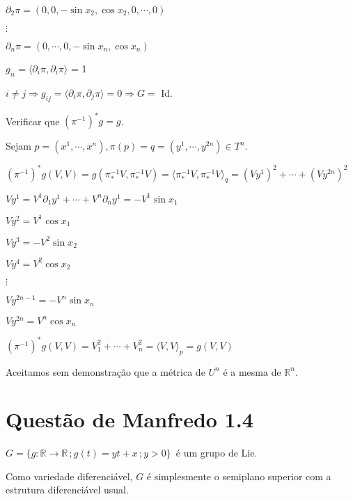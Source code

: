 \documentclass[10pt,a4paper]{article}
\begin{document}
		$\partial_2 \pi = (0, 0, - \sin x_2, \cos x_2, 0, \cdots, 0)$

		$\vdots$

		$\partial_n \pi = (0, \cdots, 0, - \sin x_n, \cos x_n)$

		$g_{ii} = \langle \partial_i \pi, \partial_i \pi \rangle$ = 1

		$i \ne j \Rightarrow g_{ij} = \langle \partial_i \pi, \partial_j \pi \rangle = 0 \Rightarrow G =$ Id.

		\vspace{3mm}

		Verificar que ${(\pi^{-1})}^* g = g$.

		Sejam $p = (x^1, \cdots, x^n), \pi(p) = q = (y^1, \cdots, y^{2n}) \in T^n$.

		${(\pi^{-1})}^* g(V,V) = g(\pi^{-1}_* V, \pi^{-1}_* V) = \langle \pi^{-1}_* V, \pi^{-1}_* V\rangle_q = (Vy^1)^2 + \cdots + (Vy^{2n})^2$

		$V y^1 = V^1 \partial_1 y^1 + \cdots + V^n \partial_n y^1 = - V^1 \sin x_1$

		$V y^2 = V^1 \cos x_1$

		$V y^3 = - V^2 \sin x_2$

		$V y^4 = V^2 \cos x_2$

		$\vdots$

		$V y^{2n - 1} = - V^n \sin x_n$

		$V y^{2n} = V^n \cos x_n$

		${(\pi^{-1})}^* g(V,V) = V_1^2 + \cdots + V_n^2 = \langle V, V \rangle_p = g(V, V)$

		\vspace{3mm}

		Aceitamos sem demonstra\c{c}\~ao que a m\'etrica de $U^n$ \'e a mesma de $\mathbb{R}^n$.

	\section{Quest\~ao de Manfredo 1.4}
		\begin{flushright}
		\end{flushright}

		$G = \{g : \mathbb{R} \rightarrow \mathbb{R} \,; g(t) = yt + x \,; y > 0 \}\,$ \'e um grupo de Lie.

		Como variedade diferenci\'avel, $G$ \'e simplesmente o semiplano superior com a estrutura diferenci\'avel usual.

		\vspace{3mm}
\end{document}
